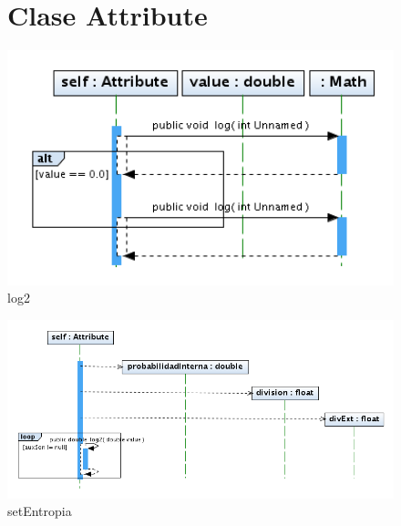 \documentclass[letterpaper,12pt]{report}
\begin{document}
\begin{figure}
\section{Clase Attribute}
\centering
\includegraphics[width=1\textwidth]{Attribute/log2.png}
\caption{log2}
\end{figure}
\newpage
\begin{figure}
\centering
\includegraphics[width=1.2\textwidth]{Attribute/setEntropia.png}
\caption{setEntropia}
\end{figure}
\newpage


\end{document}

